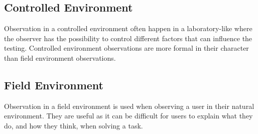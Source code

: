 \documentclass[../Main/thesis.tex]{subfiles}
\begin{document}
\subsection{Controlled Environment}
Observation in a controlled environment often happen in a laboratory-like where the observer has the possibility to control different factors that can influence the testing.
Controlled environment observations are more formal in their character than field environment observations\citep{Preece2011}.

\subsection{Field Environment}
Observation in a field environment is used when observing a user in their natural environment.
They are useful as it can be difficult for users to explain what they do, and how they think, when solving a task\citep{Preece2011}.



\onlyinsubfile{}
\onlyinsubfile{}
\end{document}
